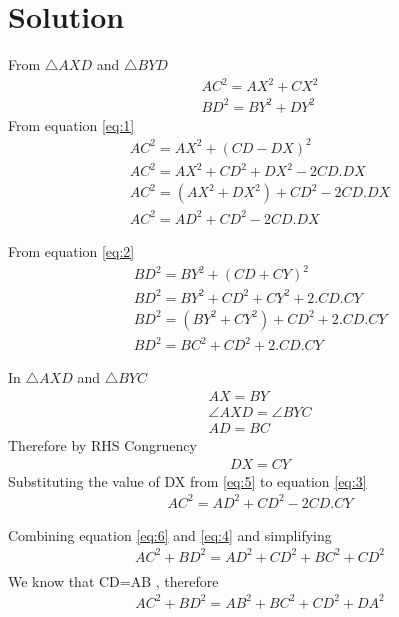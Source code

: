 \documentclass[journal,12pt,twocolumn]{IEEEtran}
\begin{document}
\section{Solution}
From $\triangle AXD$ and $\triangle BYD$
\begin{align}
AC^2 = AX^2 + CX^2\label{eq:1}\\
BD^2 =BY^2 + DY^2\label{eq:2}
\end{align}
From equation \eqref{eq:1}
\begin{align}
	AC^2 = AX^2 + (CD -DX)^2 \\
	AC^2 = AX^2 + CD^2+DX^2 -2 CD.DX\\
	AC^2 = (AX^2 +DX^2)+ CD^2 -2 CD.DX\\
	AC^2 = AD^2 + CD^2 -2 CD.DX\label{eq:3}
\end{align}

From equation \eqref{eq:2}
\begin{align}
	BD^2 =BY^2 + (CD +CY)^2 \\
	BD^2 =BY^2 + CD^2 +CY^2+2.CD.CY\\
	BD^2 =(BY^2 +CY^2)+ CD^2+2.CD.CY\\
	BD^2 =BC^2+ CD^2+2.CD.CY\label{eq:4}
\end{align}

In $\triangle AXD$ and $\triangle BYC$
\begin{align}
	AX=BY \\
	\angle AXD = \angle BYC\\ 
	AD =BC
\end{align}
Therefore by RHS Congruency
\begin{align}
	 DX = CY \label{eq:5}
\end{align}
Substituting the value of DX from \eqref{eq:5} to equation \eqref{eq:3}
\begin{align}
AC^2 = AD^2 + CD^2 -2 CD.CY\label{eq:6}	
\end{align}

Combining equation \eqref{eq:6} and \eqref{eq:4} and simplifying
\begin{align}
	AC^2 + BD^2= AD^2 + CD^2 +BC^2+ CD^2\\
\end{align}
We know that CD=AB , therefore
\begin{align}
	AC^2 + BD^2= AB^2  +BC^2+ CD^2+ DA^2
\end{align}
\end{document}
